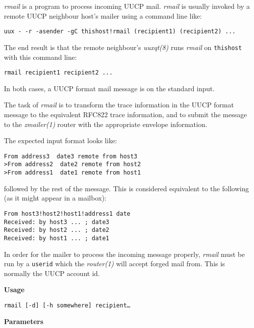 
{\em rmail\/} is a program to process incoming UUCP mail.
{\em rmail\/} is usually invoked by a remote UUCP neighbour host's
mailer using a command line like:

\begin{verbatim}
uux - -r -asender -gC thishost!rmail (recipient1) (recipient2) ...
\end{verbatim}


The end result is that the remote neighbour's {\em uuxqt(8)\/} runs
{\em rmail\/} on {\tt thishost} with this command line:

\begin{verbatim}
rmail recipient1 recipient2 ...
\end{verbatim}


In both cases, a UUCP format mail message is on the standard input.

The task of {\em rmail\/} is to transform the trace information in
the UUCP format message to the equivalent RFC822 trace
information, and to submit the message to the {\em zmailer(1)\/}
router with the appropriate envelope information.

The expected input format looks like:

\begin{verbatim}
From address3  date3 remote from host3
>From address2  date2 remote from host2
>From address1  date1 remote from host1
\end{verbatim}


followed by the rest of the message. This is considered
equivalent to the following (as it might appear in a mailbox):

\begin{verbatim}
From host3!host2!host1!address1 date
Received: by host3 ... ; date3
Received: by host2 ... ; date2
Received: by host1 ... ; date1
\end{verbatim}


In order for the mailer to process the incoming message
properly, {\em rmail\/} must be run by a {\tt userid} which the
{\em router(1)\/} will accept forged mail from. This is normally
the UUCP account id.

{\bf Usage}

{\tt rmail [-d] [-h somewhere] recipient\ldots }

{\bf Parameters}

